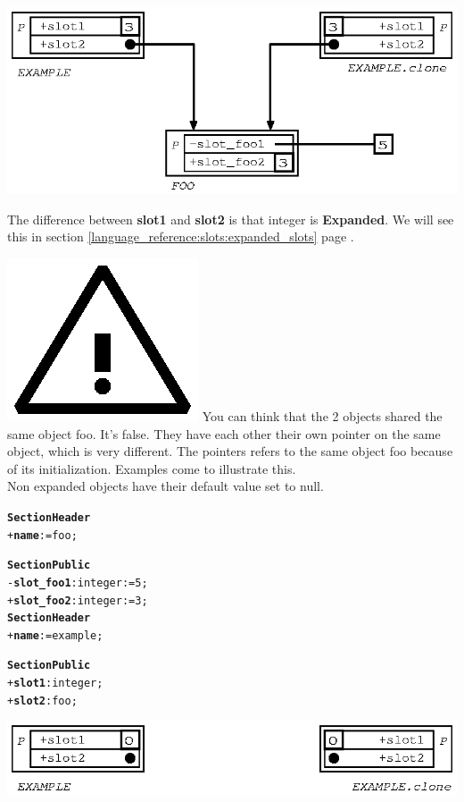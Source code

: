 \documentclass[11pt]{mybook}
\newcommand{\warning}{\includegraphics[scale=0.3]{figures/warning}}
\begin{document}
\begin{center}
\includegraphics[scale=1.0]{figures/non_shared_slot}
\end{center}

The difference between {\bf{}slot1} and {\bf{}slot2} is that {\sc{}integer} is {\bf{}Expanded}.
We will see this in section {\ref{language_reference:slots:expanded_slots}} page \pageref{language_reference:slots:expanded_slots}.

\warning{} You can think that the 2 objects shared the same object {\sc{}foo}. It's false. They have each other their own pointer on the same object, which is very different. The pointers refers to the same object {\sc{}foo} because of its initialization. Examples come to illustrate this.\\

Non expanded objects have their default value set to {\sc{}null}.

\begin{alltt}
{\bf{}Section Header}
  + {\bf{}name} := {\sc{}foo};

{\bf{}Section Public}
  - {\bf{}slot\_foo1}:{\sc{}integer} := 5;
  + {\bf{}slot\_foo2}:{\sc{}integer} := 3;\\

{\bf{}Section Header}
  + {\bf{}name} := {\sc{}example};

{\bf{}Section Public}
  + {\bf{}slot1}:{\sc{}integer};
  + {\bf{}slot2}:{\sc{}foo};
\end{alltt}

\begin{center}
\includegraphics[scale=1.0]{figures/non_shared_slot2}
\end{center}
\end{document}
